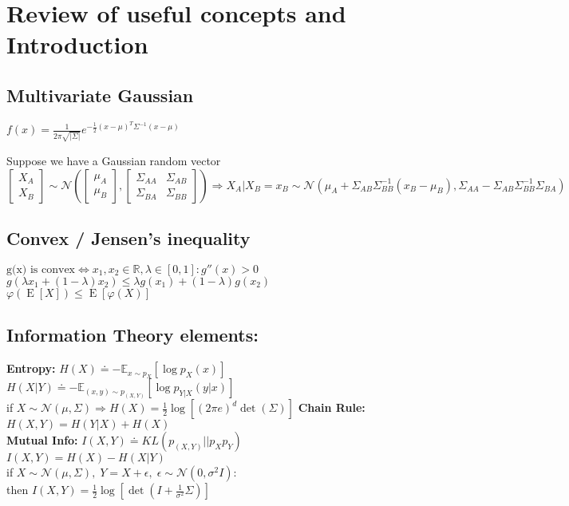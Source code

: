 \section{Review of useful concepts and Introduction}
\subsection{Multivariate Gaussian}
$f(x) = \frac{1}{2\pi \sqrt{|\Sigma|}} e^{- \frac{1}{2} (x-\mu)^T \Sigma^{-1} (x-\mu)}$

Suppose we have a Gaussian random vector
\(
\begin{bmatrix} 
    X_A \\ 
    X_B 
\end{bmatrix} 
\sim \mathcal{N}\left(
\begin{bmatrix}
    {\mu_A} \\ 
    {\mu_B}
\end{bmatrix},
\begin{bmatrix} 
    \Sigma_{AA}&\Sigma_{AB} \\
    \Sigma_{BA}&\Sigma_{BB} 
\end{bmatrix}\right)
\Rightarrow X_A\vert X_B=x_B \sim \mathcal{N}\left(
    \mu_A+\Sigma_{AB}\Sigma^{-1}_{BB}(x_B-\mu_B) , 
    \Sigma_{AA}-\Sigma_{AB}\Sigma^{-1}_{BB}\Sigma_{BA}
\right)
\)
\subsection{Convex / Jensen's inequality}
$\text{g(x) is convex} \Leftrightarrow x_1,x_2 \in \mathbb{R}, \lambda \in [0,1]: g''(x) > 0$\\
$g(\lambda x_1 + (1-\lambda) x_2) \leq \lambda g(x_1) + (1-\lambda) g(x_2)$
$\varphi(\operatorname{E}[X]) \leq  \operatorname{E}[\varphi(X)]$
\subsection{Information Theory elements:}
\textbf{Entropy:} $H(X)\doteq -\mathbb{E}_{x\sim p_X}\left[\log{p_X(x)}\right]$\\
$H(X\vert Y)\doteq -\mathbb{E}_{(x,y)\sim p_{(X,Y)}}\left[\log{p_{Y\vert X}(y\vert x)}\right]$\\
if $X\sim\mathcal{N}(\mu,\Sigma) \Rightarrow H(X) = \frac{1}{2}\log{\left[{(2\pi e)}^d \det{(\Sigma)}\right]}$
\textbf{Chain Rule:} $H(X, Y) = H(Y\vert X)+H(X)$\\
\textbf{Mutual Info:} $I(X, Y)\doteq KL(p_{(X,Y)}\vert\vert p_Xp_Y)$\\
$I(X, Y)=H(X)-H(X\vert Y)$\\
if $X\sim\mathcal{N}(\mu, \Sigma),\; Y=X+\epsilon, \; \epsilon\sim\mathcal{N}(0,\sigma^2 I)$:\\
then $I(X, Y)=\frac{1}{2}\log{\left[\det{(I+\frac{1}{\sigma^2}\Sigma)}\right]}$


